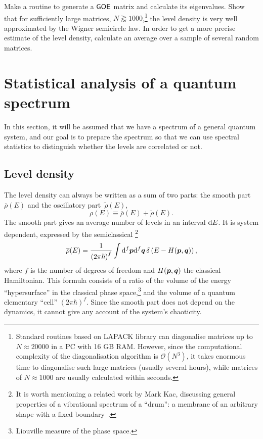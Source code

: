 \documentclass[a4paper,11pt,twoside]{article}
\begin{document}
    \begin{task}\label{task:GOE}
        Make a routine to generate a $\mathsf{GOE}$ matrix and calculate its eigenvalues.
        Show that for sufficiently large matrices, $N\gtrapprox1000$,\footnote{
            Standard routines based on LAPACK library can diagonalise matrices up to $N\approx20000$ in a PC with 16 GB RAM.
            However, since the computational complexity of the diagonalisation algorithm is $\mathcal{O}(N^{3})$, it takes enormous time to diagonalise such large matrices (usually several hours), while matrices of $N\approx1000$ are usually calculated within seconds.
        }
        the level density is very well approximated by the Wigner semicircle law.
        In order to get a more precise estimate of the level density, calculate an average over a sample of several random matrices.
    \end{task}

\section{Statistical analysis of a quantum spectrum}
    In this section, it will be assumed that we have a spectrum of a general quantum system, and our goal is to prepare the spectrum so that we can use spectral statistics to distinguish whether the levels are correlated or not.

    \subsection{Level density}
        The level density can always be written as a sum of two parts: the smooth part $\overline{\rho}(E)$ and the oscillatory part~$\tilde{\rho}(E)$,
        \begin{equation}
            \rho(E)\equiv\overline{\rho}(E)+\tilde{\rho}(E).
        \end{equation}  
        The smooth part gives an average number of levels in an interval $\mathrm{d} E$.        
        It is system dependent, expressed by the semiclassical \footnote{
            It is worth mentioning a related work by Mark Kac, discussing general properties of a vibrational spectrum of a ``drum'': a membrane of an arbitrary shape with a fixed boundary~\cite{Kac66}.
        }
        \begin{equation}
            \label{eq:Smooth}
            \overline{\rho}(E)=\frac{1}{\left(2\pi\hbar\right)^{f}}\int\mathrm{d}^{f}\boldsymbol{p}\mathrm{d}^{f}\boldsymbol{q}\,\delta\left(E-H(\boldsymbol{p},\boldsymbol{q})\right),
        \end{equation}
        where $f$ is the number of degrees of freedom and $H(\boldsymbol{p},\boldsymbol{q})$ the classical Hamiltonian.
        This formula consists of a ratio of the volume of the energy ``hypersurface'' in the classical phase space,\footnote{
            Liouville measure of the phase space.
        } and the volume of a quantum elementary ``cell'' $(2\pi\hbar)^{f}$.
        Since the smooth part does not depend on the dynamics, it cannot give any account of the system's chaoticity.
\end{document}

